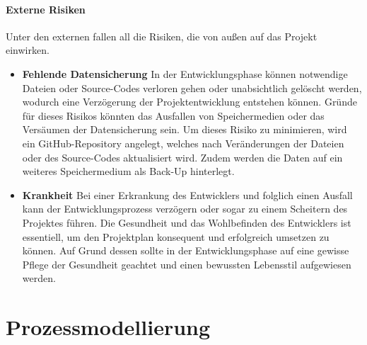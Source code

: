 \documentclass[a4paper,11pt]{article}%
\renewcommand{\\}{\vspace*{0.5\baselineskip} \newline}
\begin{document}
	\subsection{Externe Risiken}
	Unter den externen fallen all die Risiken, die von außen auf das Projekt einwirken.
	\begin{itemize}
		\item \textbf{Fehlende Datensicherung}\newline
		In der Entwicklungsphase können notwendige Dateien oder Source-Codes verloren gehen oder unabsichtlich gelöscht werden, wodurch eine Verzögerung der Projektentwicklung entstehen können. Gründe für dieses Risikos könnten das Ausfallen von Speichermedien oder das Versäumen der Datensicherung sein. Um dieses Risiko zu minimieren, wird ein GitHub-Repository angelegt, welches nach Veränderungen der Dateien oder des Source-Codes aktualisiert wird. Zudem werden die Daten auf ein weiteres Speichermedium als Back-Up hinterlegt.
		\item \textbf{Krankheit}\newline
		Bei einer Erkrankung des Entwicklers und folglich einen Ausfall kann der Entwicklungsprozess verzögern oder sogar zu einem Scheitern des Projektes führen. Die Gesundheit und das Wohlbefinden des Entwicklers ist essentiell, um den Projektplan konsequent und erfolgreich umsetzen zu können. Auf Grund dessen sollte in der Entwicklungsphase auf eine gewisse Pflege der Gesundheit geachtet und einen bewussten Lebensstil aufgewiesen werden.
	\end{itemize}

\newpage
\vspace*{\fill}
\part{Prozessmodellierung}
\vfill
\newpage
\end{document}
